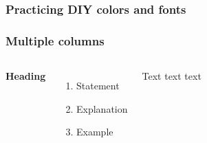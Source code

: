 \documentclass{beamer}
\begin{document}
\begin{frame}
    \frametitle{Practicing DIY colors and fonts}
\end{frame}



\begin{frame}
	\frametitle{Multiple columns}
	\begin{columns}[c] %
        \textbf{Heading}
        \begin{enumerate}
            \item Statement
            \item Explanation
            \item Example
        \end{enumerate}
            Text text text
        \end{columns}
\end{frame}
\end{document}
